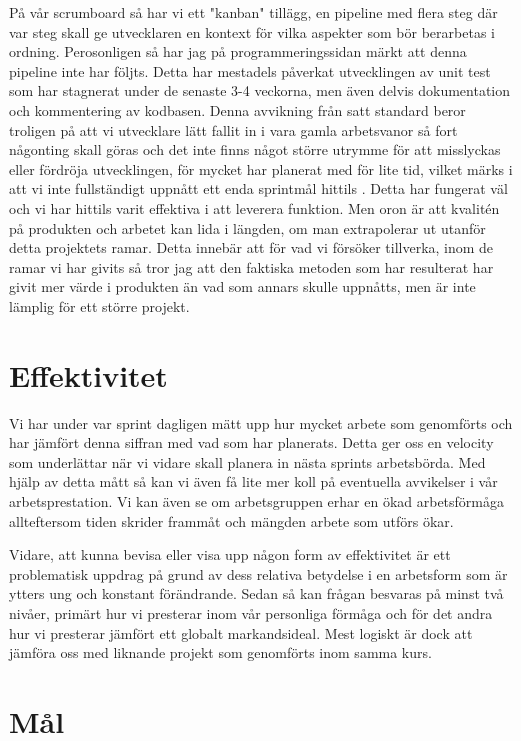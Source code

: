 \documentclass[a4paper]{report}
\begin{document}
På vår scrumboard så har vi ett "kanban" tillägg, en pipeline med flera steg
där var steg skall ge utvecklaren en kontext för vilka aspekter som bör
berarbetas i ordning. Perosonligen så har jag på programmeringssidan märkt att
denna pipeline inte har följts. Detta har mestadels påverkat utvecklingen av
unit test som har stagnerat under de senaste 3-4 veckorna, men även delvis
dokumentation och kommentering av kodbasen. Denna avvikning från satt standard
beror troligen på att vi utvecklare lätt fallit in i vara gamla arbetsvanor så
fort någonting skall göras och det inte finns något större utrymme för att
misslyckas eller fördröja utvecklingen, för mycket har planerat med för lite
tid, vilket märks i att vi inte fullständigt uppnått ett enda sprintmål hittils
. Detta har fungerat väl och vi har hittils varit effektiva i att leverera
funktion. Men oron är att kvalitén på produkten och arbetet kan lida i längden,
om man extrapolerar ut utanför detta projektets ramar. Detta innebär att för
vad vi försöker tillverka, inom de ramar vi har givits så tror jag att den
faktiska metoden som har resulterat har givit mer värde i produkten än vad som
annars skulle uppnåtts, men är inte lämplig för ett större projekt.

\section*{Effektivitet}

Vi har under var sprint dagligen mätt upp hur mycket arbete som genomförts och
har jämfört denna siffran med vad som har planerats. Detta ger oss en velocity
som underlättar när vi vidare skall planera in nästa sprints arbetsbörda. Med
hjälp av detta mått så kan vi även få lite mer koll på eventuella avvikelser i
vår arbetsprestation. Vi kan även se om arbetsgruppen erhar en ökad
arbetsförmåga allteftersom tiden skrider frammåt och mängden arbete som utförs
ökar.

Vidare, att kunna bevisa eller visa upp någon form av effektivitet är ett
problematisk uppdrag på grund av dess relativa betydelse i en arbetsform som är
ytters ung och konstant förändrande. Sedan så kan frågan besvaras på minst två
nivåer, primärt hur vi presterar inom vår personliga förmåga och för det andra
hur vi presterar jämfört ett globalt markandsideal. Mest logiskt är dock att
jämföra oss med liknande projekt som genomförts inom samma kurs.

\section*{Mål}
\end{document}
